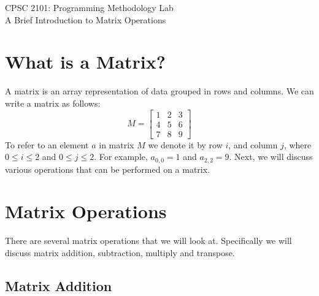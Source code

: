 \documentclass[12pt]{article}
\begin{document}
\begin{center}
\normalsize{CPSC 2101: Programming Methodology Lab} \\
\vspace{.2cm}
\large{A Brief Introduction to Matrix Operations} \\
\end{center}

\section{What is a Matrix?}
A matrix is an array representation of data grouped in rows and columns. We can write a matrix as follows:
\[
M =
	\begin{bmatrix} 
		1 & 2 & 3 \\
		4 & 5 & 6 \\
		7 & 8 & 9
	\end{bmatrix}
\]
To refer to an element $a$ in matrix $M$ we denote it by row $i$, and column $j$, where $0 \leqslant i \leqslant 2$ and $0 \leqslant j \leqslant 2$. For example, $a_{0,0} = 1$ and $a_{2,2} = 9$. Next, we will discuss various operations that can be performed on a matrix.

\section{Matrix Operations}

There are several matrix operations that we will look at. Specifically we will discuss matrix addition, subtraction, multiply and transpose.

\subsection{Matrix Addition}
\end{document}
